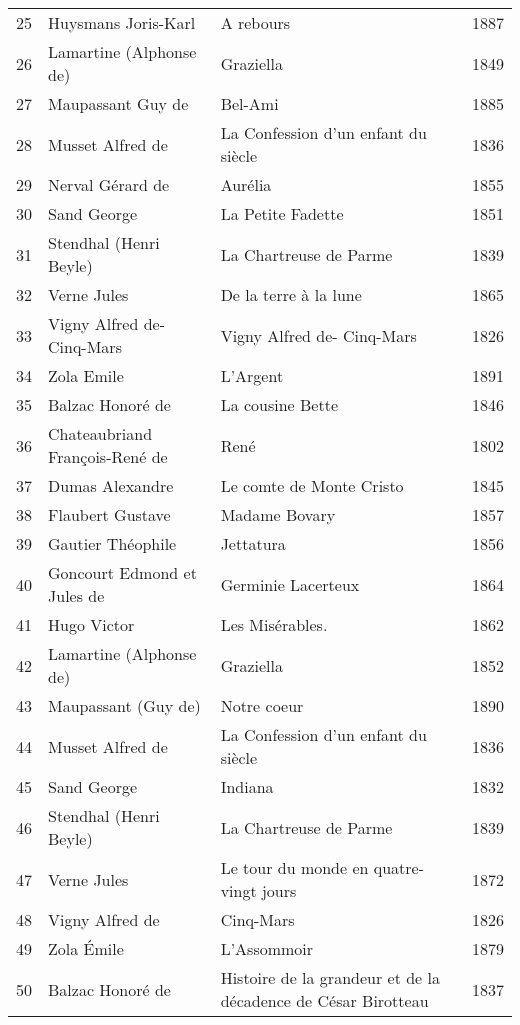 \begin{table}[H]
\begin{tabular}{l l l l}
    25 & Huysmans Joris-Karl & A rebours & 1887 \\
    26 & Lamartine (Alphonse de) & Graziella & 1849 \\
    27 & Maupassant Guy de & Bel-Ami & 1885 \\
    28 & Musset Alfred de & La Confession d’un enfant du siècle & 1836 \\
    29 & Nerval Gérard de & Aurélia & 1855 \\
    30 & Sand George & La Petite Fadette & 1851 \\
    31 & Stendhal (Henri Beyle) & La Chartreuse de Parme & 1839 \\
    32 & Verne Jules & De la terre à la lune & 1865 \\
    33 & Vigny Alfred de- Cinq-Mars & Vigny Alfred de- Cinq-Mars & 1826 \\
    34 & Zola Emile & L'Argent & 1891 \\
    35 & Balzac Honoré de & La cousine Bette & 1846 \\
    36 & Chateaubriand François-René de & René & 1802 \\
    37 & Dumas Alexandre & Le comte de Monte Cristo & 1845 \\
    38 & Flaubert Gustave & Madame Bovary & 1857 \\
    39 & Gautier Théophile & Jettatura & 1856 \\
    40 & Goncourt Edmond et Jules de & Germinie Lacerteux & 1864 \\
    41 & Hugo Victor & Les Misérables. & 1862 \\
    42 & Lamartine (Alphonse de) & Graziella & 1852 \\
    43 & Maupassant (Guy de) & Notre coeur & 1890 \\
    44 & Musset Alfred de & La Confession d’un enfant du siècle & 1836 \\
    45 & Sand George & Indiana & 1832 \\
    46 & Stendhal (Henri Beyle) & La Chartreuse de Parme & 1839 \\
    47 & Verne Jules & Le tour du monde en quatre-vingt jours & 1872 \\
    48 & Vigny Alfred de & Cinq-Mars & 1826 \\
    49 & Zola Émile & L’Assommoir & 1879 \\
    50 & Balzac Honoré de & Histoire de la grandeur et de la décadence de César Birotteau & 1837 \\
    \bottomrule
  \end{tabular}
\end{table}


